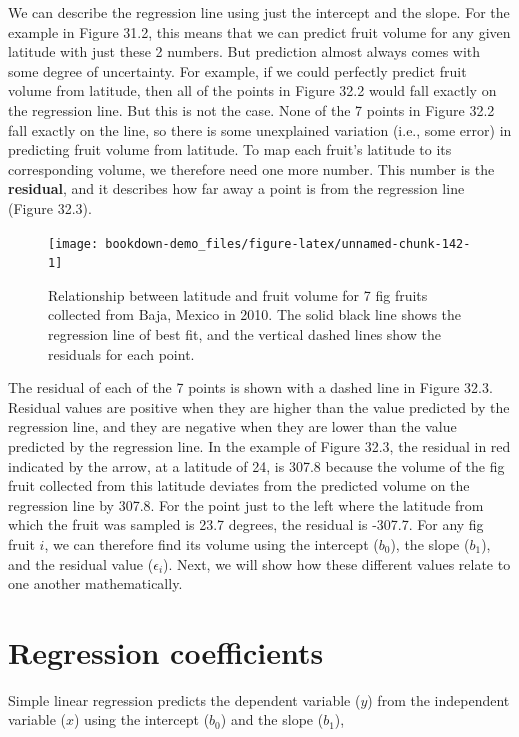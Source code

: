 \documentclass[
  openany]{krantz}
\begin{document}
We can describe the regression line using just the intercept and the slope.
For the example in Figure 31.2, this means that we can predict fruit volume for any given latitude with just these 2 numbers.
But prediction almost always comes with some degree of uncertainty.
For example, if we could perfectly predict fruit volume from latitude, then all of the points in Figure 32.2 would fall exactly on the regression line.
But this is not the case.
None of the 7 points in Figure 32.2 fall exactly on the line, so there is some unexplained variation (i.e., some error) in predicting fruit volume from latitude.
To map each fruit's latitude to its corresponding volume, we therefore need one more number.
This number is the \textbf{residual}, and it describes how far away a point is from the regression line (Figure 32.3).

\begin{figure}
\texttt{[image: bookdown-demo\_files/figure-latex/unnamed-chunk-142-1]} \caption{Relationship between latitude and fruit volume for 7 fig fruits collected from Baja, Mexico in 2010. The solid black line shows the regression line of best fit, and the vertical dashed lines show the residuals for each point.}\label{fig:unnamed-chunk-142}
\end{figure}

The residual of each of the 7 points is shown with a dashed line in Figure 32.3.
Residual values are positive when they are higher than the value predicted by the regression line, and they are negative when they are lower than the value predicted by the regression line.
In the example of Figure 32.3, the residual in red indicated by the arrow, at a latitude of 24, is 307.8 because the volume of the fig fruit collected from this latitude deviates from the predicted volume on the regression line by 307.8.
For the point just to the left where the latitude from which the fruit was sampled is 23.7 degrees, the residual is -307.7.
For any fig fruit \(i\), we can therefore find its volume using the intercept (\(b_{0}\)), the slope (\(b_{1}\)), and the residual value (\(\epsilon_{i}\)).
Next, we will show how these different values relate to one another mathematically.

\hypertarget{regression-coefficients}{%
\section{Regression coefficients}\label{regression-coefficients}}

Simple linear regression predicts the dependent variable (\(y\)) from the independent variable (\(x\)) using the intercept (\(b_{0}\)) and the slope (\(b_{1}\)),
\end{document}
